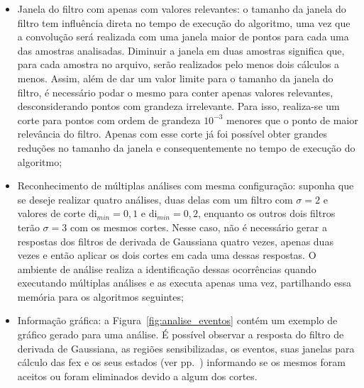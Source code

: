 \begin{itemize}
\item Janela do filtro com apenas com valores relevantes: o tamanho da
janela do filtro tem influência direta no tempo de execução do
algoritmo, uma vez que a convolução será realizada com uma janela
maior de pontos para cada uma das amostras analisadas. Diminuir a
janela em duas amostras significa que, para cada amostra no arquivo,
serão realizados pelo menos dois cálculos a menos. Assim, além de dar
um valor limite para o tamanho da janela do filtro, é necessário podar
o mesmo para conter apenas valores relevantes, desconsiderando pontos
com grandeza irrelevante. Para isso, realiza-se um corte para pontos
com ordem de grandeza $10^{-3}$ menores que o ponto de maior
relevância do filtro. Apenas com esse corte já foi possível obter
grandes reduções no tamanho da janela e consequentemente no tempo de
execução do algoritmo;

\item Reconhecimento de múltiplas análises com mesma configuração:
suponha que se deseje realizar quatro análises, duas delas com um filtro com
$\sigma=2$ e valores de corte \acs{di}$_{min}=0,1$ e
\acs{di}$_{min}=0,2$, enquanto os outros dois filtros terão
$\sigma=3$ com os mesmos cortes. Nesse caso, não é necessário gerar a
respostas dos filtros de derivada de Gaussiana quatro vezes, apenas
duas vezes e então aplicar os dois cortes em cada uma dessas
respostas. O ambiente de análise realiza a identificação dessas
ocorrências quando executando múltiplas análises e as executa apenas
uma vez, partilhando essa memória para os algoritmos seguintes;

\item Informação gráfica: a Figura~\ref{fig:analise_eventos} contém um
exemplo de gráfico gerado para uma análise. É possível observar a
resposta do filtro de derivada de Gaussiana, as regiões
sensibilizadas, os eventos, suas janelas para cálculo das \acs{fex} e
os seus estados (ver pp.~\pageref{text:estados_eventos}) informando se
os mesmos foram aceitos ou foram eliminados devido a algum dos cortes.

\end{itemize}


